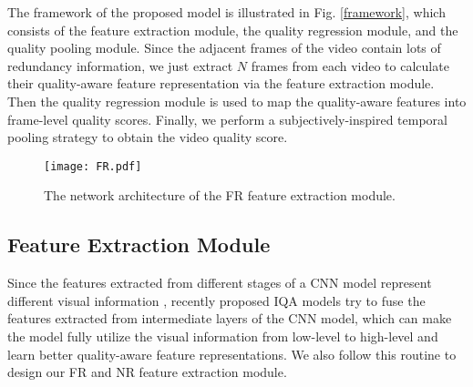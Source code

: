 \documentclass{article}
\begin{document}
The framework of the proposed model is illustrated in Fig. \ref{framework}, which consists of the feature extraction module, the quality regression module, and the quality pooling module. Since the adjacent frames of the video contain lots of redundancy information, we just extract $N$ frames from each video to calculate their quality-aware feature representation via the feature extraction module. Then the quality regression module is used to map the quality-aware features into frame-level quality scores. Finally, we perform a subjectively-inspired temporal pooling strategy to obtain the video quality score.


\begin{figure}[!t]
	\centering
	\texttt{[image: FR.pdf]}
	\caption{The network architecture of the FR feature extraction module.}
	\label{FR}
	\vspace{-0.3cm}
\end{figure}

\subsection{Feature Extraction Module}
Since the features extracted from different stages of a CNN model represent different visual information \cite{zeiler2014visualizing}, recently proposed IQA models try to fuse the features extracted from intermediate layers of the CNN model, which can make the model fully utilize the visual information from low-level to high-level and learn better quality-aware feature representations. We also follow this routine to design our FR and NR feature extraction module.
\end{document}
